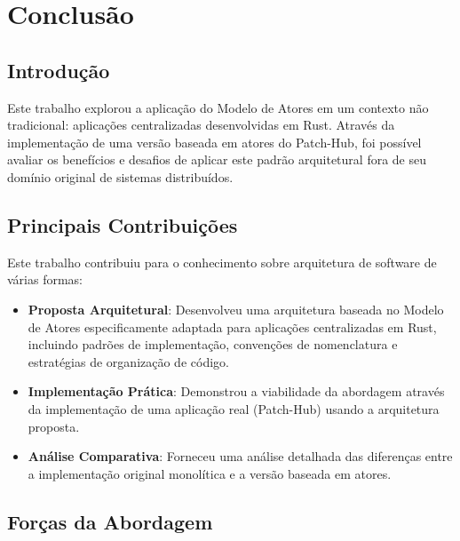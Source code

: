 \chapter{Conclusão}

\section{Introdução}

Este trabalho explorou a aplicação do Modelo de Atores em um contexto não tradicional: aplicações centralizadas desenvolvidas em Rust. Através da implementação de uma versão baseada em atores do Patch-Hub, foi possível avaliar os benefícios e desafios de aplicar este padrão arquitetural fora de seu domínio original de sistemas distribuídos.

\section{Principais Contribuições}

Este trabalho contribuiu para o conhecimento sobre arquitetura de software de várias formas:

\begin{itemize}
    \item \textbf{Proposta Arquitetural}: Desenvolveu uma arquitetura baseada no Modelo de Atores especificamente adaptada para aplicações centralizadas em Rust, incluindo padrões de implementação, convenções de nomenclatura e estratégias de organização de código.
    
    \item \textbf{Implementação Prática}: Demonstrou a viabilidade da abordagem através da implementação de uma aplicação real (Patch-Hub) usando a arquitetura proposta.
    
    \item \textbf{Análise Comparativa}: Forneceu uma análise detalhada das diferenças entre a implementação original monolítica e a versão baseada em atores.
\end{itemize}

\section{Forças da Abordagem}


